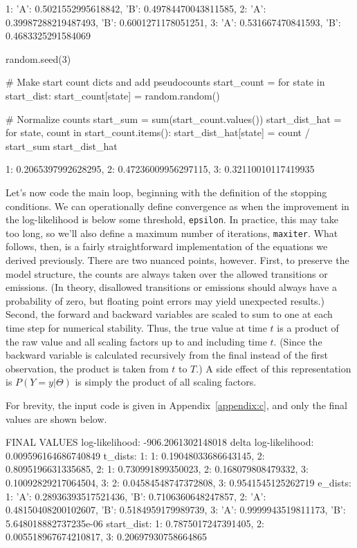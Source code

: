\begin{NotebookOut}
{1: {'A': 0.5021552995618842, 'B': 0.49784470043811585},
 2: {'A': 0.39987288219487493, 'B': 0.6001271178051251},
 3: {'A': 0.531667470841593, 'B': 0.4683325291584069}}
\end{NotebookOut}

\begin{NotebookIn}
random.seed(3)

# Make start count dicts and add pseudocounts
start_count = {}
for state in start_dist:
    start_count[state] = random.random()

# Normalize counts
start_sum = sum(start_count.values())
start_dist_hat = {}
for state, count in start_count.items():
    start_dist_hat[state] = count / start_sum
start_dist_hat
\end{NotebookIn}

\begin{NotebookOut}
{1: 0.2065397992628295, 2: 0.47236009956297115, 3: 0.32110010117419935}
\end{NotebookOut}

Let's now code the main loop, beginning with the definition of the stopping conditions. We can operationally define convergence as when the improvement in the log-likelihood is below some threshold, \texttt{epsilon}. In practice, this may take too long, so we'll also define a maximum number of iterations, \texttt{maxiter}. What follows, then, is a fairly straightforward implementation of the equations we derived previously. There are two nuanced points, however. First, to preserve the model structure, the counts are always taken over the allowed transitions or emissions. (In theory, disallowed transitions or emissions should always have a probability of zero, but floating point errors may yield unexpected results.) Second, the forward and backward variables are scaled to sum to one at each time step for numerical stability. Thus, the true value at time $t$ is a product of the raw value and all scaling factors up to and including time $t$. (Since the backward variable is calculated recursively from the final instead of the first observation, the product is taken from $t$ to $T$.) A side effect of this representation is $P(Y=y|\Theta)$ is simply the product of all scaling factors.

For brevity, the input code is given in Appendix~\ref{appendix:c}, and only the final values are shown below.

\begin{NotebookOut}
FINAL VALUES
log-likelihood: -906.2061302148018
delta log-likelihood: 0.009596164686740849
t_dists: {1: {1: 0.19048033686643145,
              2: 0.8095196631335685},
          2: {1: 0.730991899350023,
              2: 0.168079808479332,
              3: 0.10092829217064504},
          3: {2: 0.04584548747372808,
              3: 0.9541545125262719}}
e_dists: {1: {'A': 0.28936393517521436,
              'B': 0.7106360648247857},
          2: {'A': 0.48150408200102607,
              'B': 0.5184959179989739},
          3: {'A': 0.9999943519811173,
              'B': 5.648018882737235e-06}}
start_dist: {1: 0.7875017247391405,
             2: 0.005518967674210817,
             3: 0.20697930758664865}
\end{NotebookOut}

